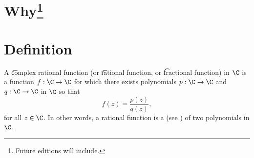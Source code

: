 

\section*{Why\footnote{Future editions will include.}}

\section*{Definition}

A \t{complex rational function} (or \t{rational function}, or \t{fractional function}) in $\C $ is a function $f: \C  \to \C $ for which there exists polynomials $p: \C  \to \C $ and $q: \C \to \C $ in $\C $ so that
    \[
f(z) = \frac{p(z)}{q(z)},
    \]
for all $z \in \C $.
In other words, a rational function is a  (see ) of two polynomials in $\C $.

\blankpage